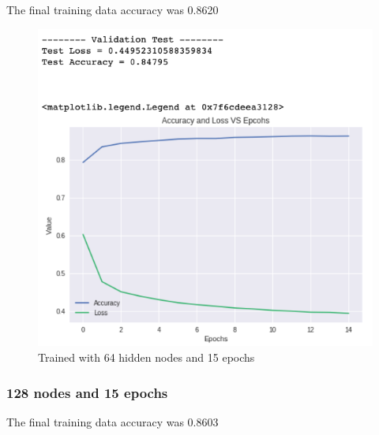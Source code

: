 \documentclass[a4paper, 12pt]{article}
\begin{document}
    The final training data accuracy was 0.8620

    \begin{figure}[h!]
        \centering
        \captionsetup{justification=centering}
        \includegraphics[scale = 0.37]{64_15.png}
        \caption{Trained with 64 hidden nodes and 15 epochs}
    \end{figure}
    
    \subsubsection{128 nodes and 15 epochs}

    The final training data accuracy was 0.8603
\end{document}
